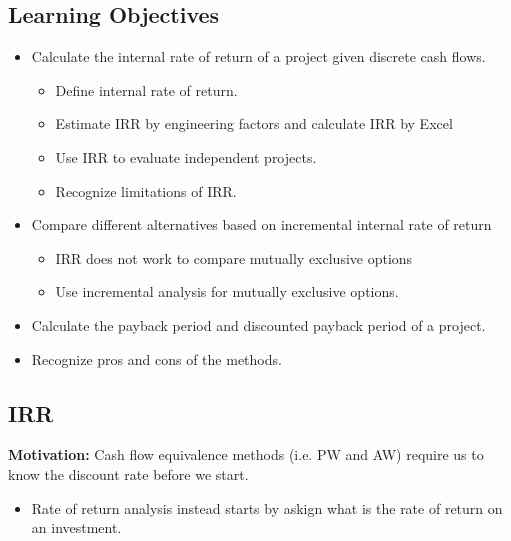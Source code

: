 \subsection{Learning Objectives}
\begin{definition}
    \begin{itemize}
        \item Calculate the internal rate of return of a project given discrete cash flows. 
        \begin{itemize}
            \item Define internal rate of return. 
            \item Estimate IRR by engineering factors and calculate IRR by Excel
            \item Use IRR to evaluate independent projects. 
            \item Recognize limitations of IRR. 
        \end{itemize}
        \item Compare different alternatives based on incremental internal rate of return
        \begin{itemize}
            \item IRR does not work to compare mutually exclusive options
            \item Use incremental analysis for mutually exclusive options. 
        \end{itemize}
        \item Calculate the payback period and discounted payback period of a project. 
        \item Recognize pros and cons of the methods. 
    \end{itemize}
\end{definition}

\subsection{IRR}
\begin{intuition}

    \textbf{Motivation:} Cash flow equivalence methods (i.e. PW and AW) require us to know the discount rate before we start.
    \begin{itemize}
        \item Rate of return analysis instead starts by askign what is the rate of return on an investment. 
    \end{itemize}
\end{intuition}

